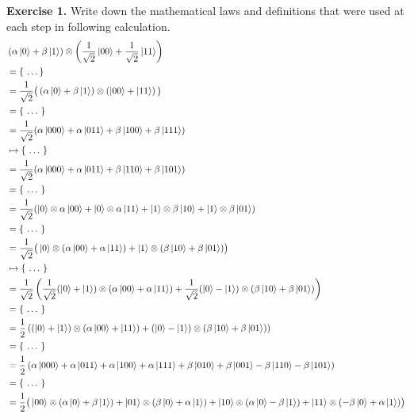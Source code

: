 \documentclass[a4paper, 11pt]{article}
\theoremstyle{definition}
\begin{document}
\noindent
\textbf{Exercise 1.} Write down the mathematical laws and definitions
that were used at each step
in following calculation.
\begin{align*}
  & \left (\alpha \ket{0} + \beta \ket{1} \right ) \otimes \left
  (\frac{1}{\sqrt{2}}\ket{00} + \frac{1}{\sqrt{2}}\ket{11} \right ) \\
  & = \{\ \dots  \} \\
  & = \frac{1}{\sqrt{2}} \big ( \left (\alpha \ket{0} + \beta \ket{1} \right )
    \otimes \left (\ket{00} + \ket{11} \right ) \big ) \\
  & = \{\ \dots\ \} \\
  & = \frac{1}{\sqrt{2}} ( \alpha \ket{000} + \alpha \ket{011} +
    \beta \ket{100} + \beta \ket{111} ) \\
  & \mapsto \{\ \dots\ \} \\
  & = \frac{1}{\sqrt{2}} ( \alpha \ket{000} + \alpha \ket{011} +
    \beta \ket{110} + \beta \ket{101} )  \\
  & = \{\ \dots\ \} \\
  & = \frac{1}{\sqrt{2}} ( \ket{0} \otimes \alpha\ket{00} + \ket{0} \otimes
    \alpha \ket{11} + \ket{1} \otimes \beta \ket{10} + \ket{1} \otimes \beta \ket{01} )
  \\
  & = \{\ \dots\ \} \\
  & = \frac{1}{\sqrt{2}} \big ( \ket{0} \otimes (\alpha\ket{00} + \alpha \ket{11}) +
    \ket{1} \otimes (\beta \ket{10} +  \beta \ket{01}) \big ) \\
  & \mapsto \{\ \dots\ \} \\
  & = \frac{1}{\sqrt{2}} \left ( \frac{1}{\sqrt{2}} (\ket{0} + \ket{1})
    \otimes (\alpha\ket{00} + \alpha \ket{11}) + \frac{1}{\sqrt{2}} (\ket{0} - \ket{1})
    \otimes (\beta \ket{10} +  \beta \ket{01}) \right ) \\
  & = \{\ \dots\ \} \\
  & = \frac{1}{2} \left ( (\ket{0} + \ket{1})
    \otimes (\alpha\ket{00} + \ket{11}) +  (\ket{0} - \ket{1})
    \otimes (\beta \ket{10} +  \beta \ket{01}) \right ) \\
  & = \{\ \dots\ \} \\
  & = \frac{1}{2} \left ( \alpha \ket{000} + \alpha \ket{011} +
    \alpha \ket{100} + \alpha \ket{111} + \beta \ket{010} + \beta \ket{001}
    - \beta \ket{110} - \beta \ket{101} \right ) \\
  & = \{\ \dots\ \} \\
  & = \frac{1}{2} \big ( \ket{00} \otimes (\alpha \ket{0} + \beta \ket{1})
    + \ket{01} \otimes (\beta \ket{0} + \alpha \ket{1}) +
    \ket{10} \otimes (\alpha \ket{0} - \beta \ket{1}) +
    \ket{11} \otimes (-\beta \ket{0}  + \alpha \ket{1} ) \big )
\end{align*}
\end{document}
